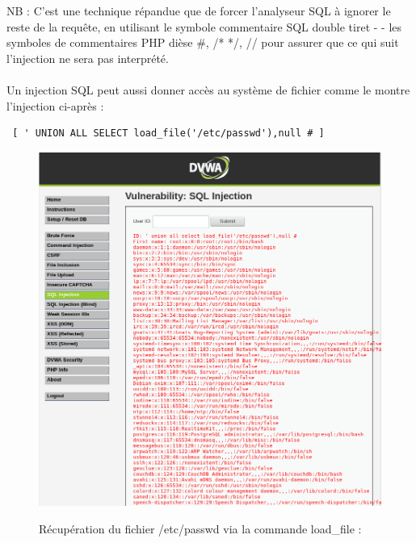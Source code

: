 NB : C'est une technique répandue que de forcer l'analyseur SQL à ignorer le reste de la requête, en utilisant le symbole commentaire SQL double tiret - - les symboles de commentaires PHP dièse \#, {/* */}, {//} pour assurer que ce qui suit l'injection ne sera pas interprété.  



\paragraph{}
Un injection SQL peut aussi donner accès au système de fichier comme le montre l'injection ci-après :
\begin{verbatim} [ ' UNION ALL SELECT load_file('/etc/passwd'),null # ] \end{verbatim}

\begin{figure}[!h]
	\begin{center}
		\label{}
		\includegraphics[scale=\scaledvwa]{images/sql/sqli_low2.png}
		\caption{Récupération du fichier /etc/passwd via la commande load\_file : }
	\end{center}
\end{figure}






